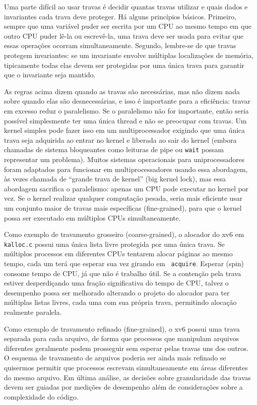 Uma parte difícil ao usar travas é decidir quantas travas
utilizar e quais dados e invariantes cada trava deve proteger.
Há alguns princípios básicos.
Primeiro, sempre que uma variável puder ser escrita por um CPU
ao mesmo tempo em que outro CPU puder lê-la ou escrevê-la,
uma trava deve ser usada para evitar que essas
operações ocorram simultaneamente.
Segundo, lembre-se de que travas protegem invariantes:
se um invariante envolve múltiplas localizações de memória,
tipicamente todas elas devem ser protegidas
por uma única trava para garantir que o invariante seja mantido.

As regras acima dizem quando as travas são necessárias, mas não dizem nada sobre quando elas
são desnecessárias, e isso é importante para a eficiência: travar em excesso
reduz o paralelismo. Se o paralelismo não for importante, então seria possível
simplesmente ter uma única thread e não se preocupar com travas. Um kernel
simples pode fazer isso em um multiprocessador exigindo que uma única trava
seja adquirida ao entrar no kernel e liberada ao sair do kernel (embora
chamadas de sistema bloqueantes como leituras de pipe ou
\lstinline{wait}
possam representar um problema). Muitos sistemas operacionais para uniprocessadores foram adaptados para
funcionar em multiprocessadores usando essa abordagem, às vezes chamada de
``grande trava de kernel'' (big kernel lock), mas essa abordagem sacrifica o paralelismo: apenas um
CPU pode executar no kernel por vez. Se o kernel realizar qualquer computação pesada,
seria mais eficiente usar um conjunto maior de travas mais específicas (fine-grained),
para que o kernel possa ser executado em múltiplos CPUs simultaneamente.

Como exemplo de travamento grosseiro (coarse-grained), o alocador do xv6 em \lstinline{kalloc.c}
possui uma única lista livre protegida por uma única trava. Se
múltiplos processos em diferentes CPUs tentarem alocar páginas ao mesmo
tempo, cada um terá que esperar sua vez girando em {\tt
  acquire}. Esperar (spin) consome tempo de CPU, já que não é trabalho útil.
Se a contenção pela trava estiver desperdiçando uma fração significativa do tempo de CPU,
talvez o desempenho possa ser melhorado alterando o projeto do alocador
para ter múltiplas listas livres, cada uma com sua própria trava, permitindo
alocação realmente paralela.

Como exemplo de travamento refinado (fine-grained), o xv6 possui uma trava separada para
cada arquivo, de forma que processos que manipulam arquivos diferentes geralmente podem
prosseguir sem esperar pelas travas uns dos outros. O esquema de travamento de arquivos
poderia ser ainda mais refinado se quisermos permitir que processos
escrevam simultaneamente em áreas diferentes do mesmo arquivo.
Em última análise, as decisões sobre granularidade das travas devem ser guiadas por medições de desempenho
além de considerações sobre a complexidade do código.

